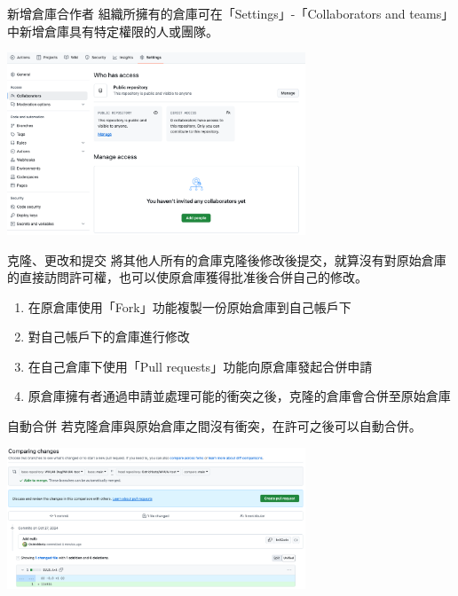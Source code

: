 \documentclass[xetex, unicode, 10pt, aspectratio=169]{beamer}
\begin{document}
\begin{frame}{新增倉庫合作者}
    組織所擁有的倉庫可在「Settings」-「Collaborators and teams」中新增倉庫具有特定權限的人或團隊。
    \begin{center}
        \includegraphics[width=3.5in]{./img/github-private-collaborators.png}
    \end{center}
\end{frame}

\begin{frame}{克隆、更改和提交}
    將其他人所有的倉庫克隆後修改後提交，就算沒有對原始倉庫的直接訪問許可權，也可以使原倉庫獲得批准後合併自己的修改。
    \begin{enumerate}
        \item 在原倉庫使用「Fork」功能複製一份原始倉庫到自己帳戶下
        \item 對自己帳戶下的倉庫進行修改
        \item 在自己倉庫下使用「Pull requests」功能向原倉庫發起合併申請
        \item 原倉庫擁有者通過申請並處理可能的衝突之後，克隆的倉庫會合併至原始倉庫
    \end{enumerate}
\end{frame}

\begin{frame}{自動合併}
    若克隆倉庫與原始倉庫之間沒有衝突，在許可之後可以自動合併。
    \begin{center}
        \includegraphics[width=3.5in]{./img/github-pull-request-no-conflict.png}
    \end{center}
\end{frame}
\end{document}
